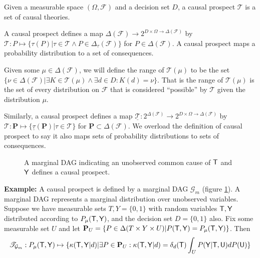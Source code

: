 \begin{definition}\label{def:causal_prospect}
Given a measurable space $(\Omega,\mathcal{F})$ and a decision set $D$, a causal prospect $\mathscr{T}$ is a set of causal theories.

A causal prospect defines a map $\Delta(\mathcal{F})\to 2^{D\times \Omega \to \Delta(\mathcal{F})}$ by $\mathscr{T}:P\mapsto \{\tau(P)|\tau\in\mathscr{T}\wedge P\in \Delta_{\tau}(\mathcal{F})\}$ for $P\in \Delta(\mathcal{F})$. A causal prospect maps a probability distribution to a set of consequences.

Given some $\mu\in \Delta(\mathcal{F})$, we will define the range of $\mathscr{T}(\mu)$ to be the set $\{\nu\in \Delta(\mathcal{F})|\exists K\in \mathscr{T}(\mu)\wedge \exists d\in D:K(d)=\nu\}$. That is the range of $\mathscr{T}(\mu)$ is the set of every distribution on $\mathcal{F}$ that is considered ``possible'' by $\mathscr{T}$ given the distribution $\mu$.

Similarly, a causal prospect defines a map $\underline{\mathscr{T}}:2^{\Delta(\mathcal{F})}\to 2^{D\times \Omega\to \Delta(\mathcal{F})}$ by $\mathscr{T}:\mathbf{P}\mapsto \{\underline{\tau}(\mathbf{P})|\tau\in\mathscr{T}\}$ for $\mathbf{P}\subset \Delta(\mathcal{F})$. We overload the definition of causal prospect to say it also maps sets of probability distributions to sets of consequences.
\end{definition}
\begin{figure}[ht]
    \centering
    \caption{A marginal DAG indicating an unobserved common cause of $\mathsf{T}$ and $\mathsf{Y}$ defines a causal prospect.}
    \label{fig:theory_strength}
\end{figure}

\textbf{Example:} A causal prospect is defined by a marginal DAG $\mathcal{G}_m$ (figure \ref{fig:theory_strength}). A marginal DAG represents a marginal distribution over unobserved variables\cite{evans_graphs_2016}. Suppose we have measurable sets $T,Y=\{0,1\}$ with random variables $\mathsf{T},\mathsf{Y}$ distributed according to $P_\mu(\mathsf{T},\mathsf{Y})$, and the decision set $D=\{0,1\}$ also. Fix some measurable set $U$ and let $\mathbf{P}_U = \{P\in \Delta(T\times Y\times U)|P(\mathsf{T},\mathsf{Y})=P_\mu(\mathsf{T},\mathsf{Y})\}$. Then 
\begin{align}
    \mathscr{T}_{\mathcal{G}_m}:P_\mu(\mathsf{T},\mathsf{Y})\mapsto \{\kappa(\mathsf{T},\mathsf{Y}|d)|\exists P\in \mathbf{P}_U: \kappa(\mathsf{T},\mathsf{Y}|d)=\delta_d(\mathsf{T})\int_{U}P(\mathsf{Y}|\mathsf{T},\mathsf{U})dP(\mathsf{U})\} \label{eq:doct_hidden}
\end{align}


